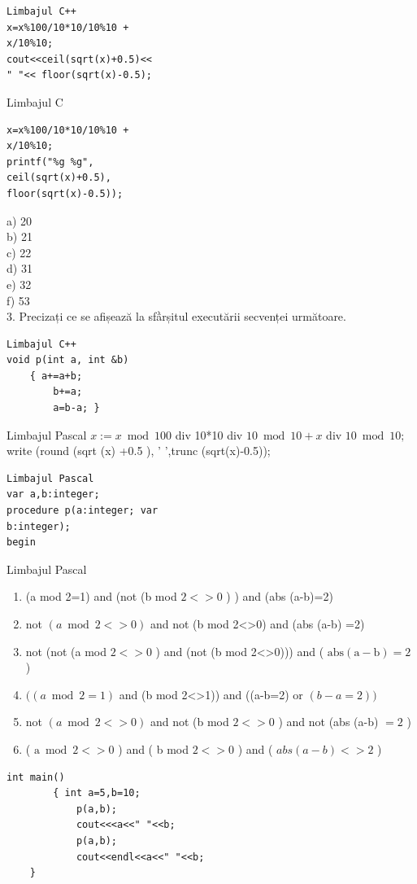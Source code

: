 \documentclass[10pt]{article}
\begin{document}
\begin{verbatim}
Limbajul C++
x=x%100/10*10/10%10 +
x/10%10;
cout<<ceil(sqrt(x)+0.5)<<
" "<< floor(sqrt(x)-0.5);
\end{verbatim}

Limbajul C

\begin{verbatim}
x=x%100/10*10/10%10 +
x/10%10;
printf("%g %g",
ceil(sqrt(x)+0.5),
floor(sqrt(x)-0.5));
\end{verbatim}

a) 20\\
b) 21\\
c) 22\\
d) 31\\
e) 32\\
f) 53\\
3. Precizați ce se afișează la sfầrșitul executării secvenței următoare.

\begin{verbatim}
Limbajul C++
void p(int a, int &b)
    { a+=a+b;
        b+=a;
        a=b-a; }
\end{verbatim}

Limbajul Pascal $x:=x \bmod 100$ div 10*10 div $10 \bmod 10+x$ div $10 \bmod 10 ;$ write (round (sqrt (x) +0.5 ), ' ',trunc (sqrt(x)-0.5));

\begin{verbatim}
Limbajul Pascal
var a,b:integer;
procedure p(a:integer; var
b:integer);
begin
\end{verbatim}

Limbajul Pascal

\begin{enumerate}
  \item (a mod 2=1) and (not (b mod $2<>0$ ) ) and (abs (a-b)=2)
  \item not $(a \bmod 2<>0)$ and not (b mod 2<>0) and (abs (a-b) =2)
  \item not (not (a mod $2<>0$ ) and (not (b mod 2<>0))) and ( $\mathrm{abs}(\mathrm{a}-\mathrm{b})=2$ )
  \item $((a \bmod 2=1)$ and (b mod 2<>1)) and ((a-b=2) or $(b-a=2))$
  \item not $(a \bmod 2<>0)$ and not (b mod $2<>0$ ) and not (abs (a-b) $=2$ )
  \item ( $\mathrm{a} \bmod 2<>0$ ) and ( b mod $2<>0$ ) and ( $a b s(a-b)<>2$ )
\end{enumerate}

\begin{verbatim}
int main()
        { int a=5,b=10;
            p(a,b);
            cout<<<a<<" "<<b;
            p(a,b);
            cout<<endl<<a<<" "<<b;
    }
\end{verbatim}
\end{document}
